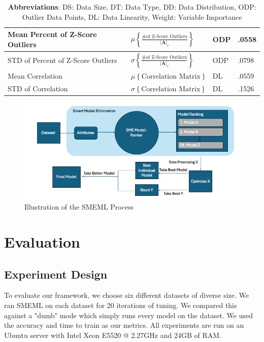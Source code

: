 \documentclass{article}
\begin{document}
\begin{table}
\begin{tabular}{llll}
    \hline
    Mean Percent of Z-Score Outliers  & 
    $\mu \left\{ \frac{\text{\# of Z-Score Outliers}}{|\mathbf{A}|_r} \right\}$ & ODP & .0558 \\
    \hline
    STD of Percent of Z-Score Outliers  &
    $\sigma \left\{ \frac{\text{\# of Z-Score Outliers}}{|\mathbf{A}|_r} \right\}$ & ODP & .0798 \\
    \hline
    Mean Correlation& $\mu \left\{\text{Correlation Matrix}\right\}$ & DL & .0559 \\
    \hline
    STD of Correlation & $\sigma \left\{\text{Correlation Matrix}\right\}$ & DL & .1526 \\
    \bottomrule
  \end{tabular}
  \captionsetup{font=footnotesize}
  \caption*{\textbf{Abbreviations}: DS: Data Size, DT: Data Type, DD: Data Distribution, ODP: Outlier Data Points, DL: Data Linearity, Weight: Variable Importance}
\end{table}


\begin {figure}
\centering
\includegraphics[width=\textwidth]{smeml-flowchart.png}
\caption{Illustration of the SMEML Process}
\end{figure}

\section{Evaluation}
\subsection{Experiment Design}
To evaluate our framework, we choose six different datasets of diverse size. We ran SMEML on each dataset for 20 iterations of tuning. We compared this against a "dumb" mode which simply runs every model on the dataset. We used the accuracy and time to train as our metrics. All experiments are run on an Ubuntu server with Intel Xeon E5520 @ 2.27GHz and 24GB of RAM.
\end{document}
